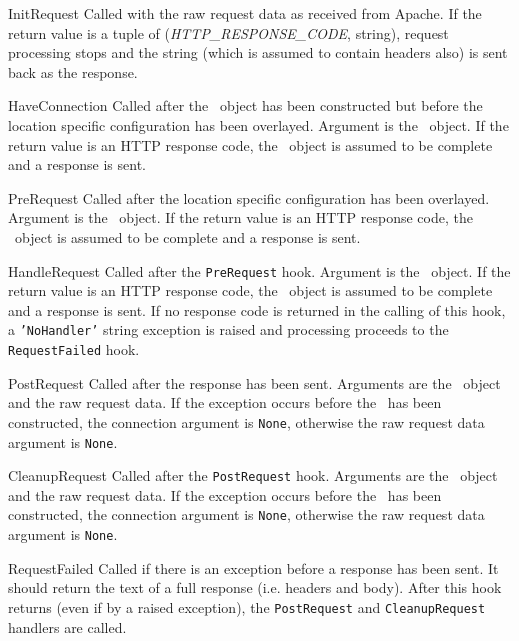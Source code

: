 \documentclass{manual}
\begin{document}
\begin{datadesc}{InitRequest} Called with the raw request data as received from
Apache.  If the return value is a tuple of
(\textit{HTTP\_RESPONSE\_CODE}, string),  request processing stops and
the string (which is assumed to contain headers also) is sent back as
the response.
\end{datadesc}
\begin{datadesc}{HaveConnection} Called after the \connection\ object has been
constructed but before the location specific configuration has been
overlayed.
Argument is the \connection\ object.  If the
return value is an HTTP response code, the \connection\  object
is assumed to be complete and a response is sent.
\end{datadesc}
\begin{datadesc}{PreRequest} Called after the location specific configuration has been
overlayed.  Argument is the \connection\ object.  If the
return value is an HTTP response code, the \connection\  object
is assumed to be complete and a response is sent.
\end{datadesc}
\begin{datadesc}{HandleRequest} Called after the \texttt{PreRequest}
hook. Argument is the \connection\  object.  If the
return value is an HTTP response code, the \connection\  object
is assumed to be complete and a response is sent.  If no response code
is returned in the calling of this hook, a \texttt{'NoHandler'} string
exception is raised and processing proceeds to the
\texttt{RequestFailed} hook.
\end{datadesc}
\begin{datadesc}{PostRequest} Called after the response has been sent. Arguments
are the \connection\  object and the raw request data.  If the
exception occurs before the \connection\  has been constructed,
the connection argument is \texttt{None}, otherwise the raw request
data argument is \texttt{None}.
\end{datadesc}
\begin{datadesc}{CleanupRequest} Called after the \texttt{PostRequest} hook. Arguments
are the \connection\  object and the raw request data.  If the
exception occurs before the \connection\  has been constructed,
the connection argument is \texttt{None}, otherwise the raw request
data argument is \texttt{None}.
\end{datadesc}
\begin{datadesc}{RequestFailed} Called if there is an exception before a response
has been sent.  It should return the text of a full response
(i.e. headers and body).  After this hook returns (even if by a raised
exception), the \texttt{PostRequest} and \texttt{CleanupRequest}
handlers are called.
\end{datadesc}
\end{document}
